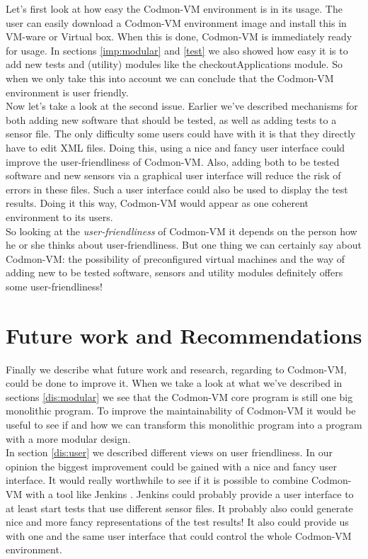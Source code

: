 \documentclass{article}
\newcommand{\project}{Codmon-VM}
\begin{document}
\noindent Let's first look at how easy the \project{} environment is in its usage. The user can easily download a \project{} environment image and install this in VM-ware or Virtual box. When this is done, 
\project{} is immediately ready for usage. In sections \ref{imp:modular} and \ref{test} we also showed how easy it is to add new tests and (utility) modules like the checkoutApplications module. So when we only take this into 
account we can conclude that the \project{} environment is user friendly.\\

\noindent Now let's take a look at the second issue. Earlier we've described mechanisms for both adding new software that should be tested, as well as adding tests to a sensor file. The only difficulty 
some users could have with it is that they directly have to edit XML files. Doing this, using a nice and fancy user interface could improve the user-friendliness of \project{}. Also, adding both to be 
tested software and new sensors via a graphical user interface will reduce the risk of errors in these files. Such a user interface could also be used to display the test results. Doing it this way, 
\project{} would appear as one coherent environment to its users.\\

\noindent So looking at the \emph{user-friendliness} of \project{} it depends on the person how he or she thinks about user-friendliness. But one thing we can certainly say about \project{}: the possibility of 
preconfigured virtual machines and the way of adding new to be tested software, sensors and utility modules definitely offers some user-friendliness!

\newpage
\section{Future work and Recommendations}
\label{sec:future}
Finally we describe what future work and research, regarding to \project{}, could be done to improve it. When we take a look at what we've described in sections \ref{dis:modular}
we see that the \project{} core program is still one big monolithic program. To improve the maintainability of \project{} it would be useful to see if and how we can transform this monolithic 
program into a program with a more modular design.\\

\noindent In section \ref{dis:user} we described different views on user friendliness. In our opinion the biggest improvement could be gained with a nice and fancy user interface. It would 
really worthwhile to see if it is possible to combine \project{} with a tool like Jenkins \cite{JenkinsDoc}. Jenkins could probably provide a user interface to at least start tests that use 
different sensor files. It probably also could generate nice and more fancy representations of the test results! It also could provide us with one and the same user interface that could control the whole \project{} 
environment.\\
\end{document}

